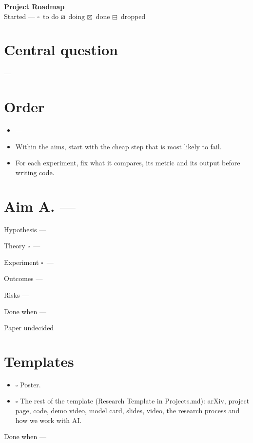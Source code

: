 \documentclass[11pt]{article}
\newcommand{\todo}{$\square$}
\newcommand{\doing}{$\boxslash$}
\newcommand{\done}{$\boxtimes$}
\newcommand{\dropped}{$\boxminus$}
\newcommand{\blank}{\textcolor{gray}{---}}
\newenvironment{fields}
  {\begin{description}[style=sameline, leftmargin=7em, labelwidth=6.5em, font=\normalfont\bfseries]}
  {\end{description}}
\newenvironment{tasks}
  {\begin{itemize}[leftmargin=1.5em, itemsep=2pt]}
  {\end{itemize}}
\begin{document}
\nocite{*}

\begin{center}
  {\Large\bfseries Project Roadmap}\\[4pt]
  Started \blank \qquad
  \todo\ to do \quad \doing\ doing \quad \done\ done \quad \dropped\ dropped
\end{center}

\section*{Central question}
\blank

\section*{Order}
\begin{itemize}[leftmargin=1.5em, itemsep=2pt]
  \item \blank
  \item Within the aims, start with the cheap step that is most likely to fail.
  \item For each experiment, fix what it compares, its metric and its output before writing code.
\end{itemize}

\section*{Aim A. \blank}
\begin{fields}
  \item[Hypothesis] \blank
  \item[Theory] \todo\ \blank
  \item[Experiment] \todo\ \blank
  \item[Outcomes] \blank
  \item[Risks] \blank
  \item[Done when] \blank
  \item[Paper] undecided
\end{fields}

\section*{Templates}
\begin{tasks}
  \item[\todo] Poster.
  \item[\todo] The rest of the template (Research Template in Projects.md): arXiv, project page, code,
    demo video, model card, slides, video, the research process and how we work with AI.
\end{tasks}
\begin{fields}
  \item[Done when] \blank
\end{fields}
\end{document}
